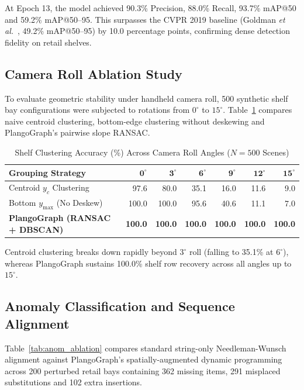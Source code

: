 \documentclass[conference]{IEEEtran}
\begin{document}
At Epoch 13, the model achieved 90.3\% Precision, 88.0\% Recall, 93.7\% mAP@50 and 59.2\% mAP@50--95. This surpasses the CVPR 2019 baseline (Goldman \textit{et al.}~\cite{goldman2019precise}, 49.2\% mAP@50--95) by 10.0 percentage points, confirming dense detection fidelity on retail shelves.

\subsection{Camera Roll Ablation Study}
To evaluate geometric stability under handheld camera roll, 500 synthetic shelf bay configurations were subjected to rotations from $0^\circ$ to $15^\circ$. Table~\ref{tab:tilt_ablation} compares naive centroid clustering, bottom-edge clustering without deskewing and PlangoGraph's pairwise slope RANSAC.

\begin{table}[h]
\centering
\caption{Shelf Clustering Accuracy (\%) Across Camera Roll Angles ($N=500$ Scenes)}
\label{tab:tilt_ablation}
\scriptsize
\begin{tabularx}{\columnwidth}{l r r r r r r}
\toprule
\textbf{Grouping Strategy} & $\mathbf{0^\circ}$ & $\mathbf{3^\circ}$ & $\mathbf{6^\circ}$ & $\mathbf{9^\circ}$ & $\mathbf{12^\circ}$ & $\mathbf{15^\circ}$ \\
\midrule
Centroid $y_c$ Clustering & 97.6 & 80.0 & 35.1 & 16.0 & 11.6 & 9.0 \\
Bottom $y_{\max}$ (No Deskew) & 100.0 & 100.0 & 95.6 & 40.6 & 11.1 & 7.0 \\
\textbf{PlangoGraph (RANSAC + DBSCAN)} & \textbf{100.0} & \textbf{100.0} & \textbf{100.0} & \textbf{100.0} & \textbf{100.0} & \textbf{100.0} \\
\bottomrule
\end{tabularx}
\end{table}

Centroid clustering breaks down rapidly beyond $3^\circ$ roll (falling to 35.1\% at $6^\circ$), whereas PlangoGraph sustains 100.0\% shelf row recovery across all angles up to $15^\circ$.

\subsection{Anomaly Classification and Sequence Alignment}
Table~\ref{tab:anom_ablation} compares standard string-only Needleman-Wunsch alignment against PlangoGraph's spatially-augmented dynamic programming across 200 perturbed retail bays containing 362 missing items, 291 misplaced substitutions and 102 extra insertions.
\end{document}
